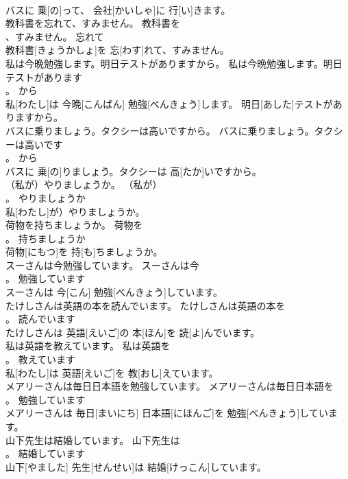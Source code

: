 \documentclass[8pt]{extreport}
\begin{document}
\begin{CJK}{UTF8}{min}
\\	バスに 乗[の]って、 会社[かいしゃ]に 行[い]きます。	
\\	教科書を忘れて、すみません。	教科書を
\\	、すみません。	忘れて	
\\	教科書[きょうかしょ]を 忘[わす]れて、すみません。	
\\	私は今晩勉強します。明日テストがありますから。	私は今晩勉強します。明日テストがあります
\\	。	から	
\\	私[わたし]は 今晩[こんばん] 勉強[べんきょう]します。 明日[あした]テストがありますから。	
\\	バスに乗りましょう。タクシーは高いですから。	バスに乗りましょう。タクシーは高いです
\\	。	から	
\\	バスに 乗[の]りましょう。タクシーは 高[たか]いですから。	
\\	（私が）やりましょうか。	（私が）
\\	。	やりましょうか	
\\	私[わたし]が）やりましょうか。	
\\	荷物を持ちましょうか。	荷物を
\\	。	持ちましょうか	
\\	荷物[にもつ]を 持[も]ちましょうか。	
\\	スーさんは今勉強しています。	スーさんは今
\\	。	勉強しています	
\\	スーさんは 今[こん] 勉強[べんきょう]しています。	
\\	たけしさんは英語の本を読んでいます。	たけしさんは英語の本を
\\	。	読んでいます	
\\	たけしさんは 英語[えいご]の 本[ほん]を 読[よ]んでいます。	
\\	私は英語を教えています。	私は英語を
\\	。	教えています	
\\	私[わたし]は 英語[えいご]を 教[おし]えています。	
\\	メアリーさんは毎日日本語を勉強しています。	メアリーさんは毎日日本語を
\\	。	勉強しています	
\\	メアリーさんは 毎日[まいにち] 日本語[にほんご]を 勉強[べんきょう]しています。	
\\	山下先生は結婚しています。	山下先生は
\\	。	結婚しています	
\\	山下[やました] 先生[せんせい]は 結婚[けっこん]しています。	

\end{CJK}
\end{document}
